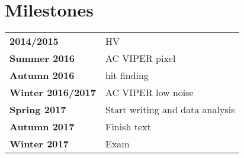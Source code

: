 \chapter{Milestones\label{chap:milestones}}
\begin{tabular}{ll}
	\textbf{2014/2015} &	HV\cite{breakdown_16,latex} \\
	\textbf{Summer 2016} &	AC VIPER pixel \\
	\textbf{Autumn 2016} &	hit finding \\
	\textbf{Winter 2016/2017} &	AC VIPER low noise \\
	\textbf{Spring 2017} &	Start writing and data analysis \\
	\textbf{Autumn 2017} &	Finish text \\
	\textbf{Winter 2017} &	Exam
\end{tabular}